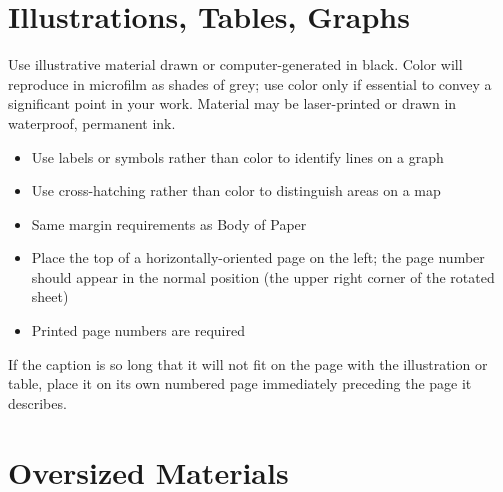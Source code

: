 \documentclass[draft]{ua-thesis}
\begin{document}
\chapter{Illustrations, Tables, Graphs}

Use illustrative material drawn or computer-generated in black. Color will
reproduce in microfilm as shades of grey; use color only if essential to
convey a significant point in your work. Material may be laser-printed or
drawn in waterproof, permanent ink.
\begin{itemize}
   \item Use labels or symbols rather than color to identify lines on a graph
   \item Use cross-hatching rather than color to distinguish areas on a map
   \item Same margin requirements as Body of Paper
   \item Place the top of a horizontally-oriented page on the left; the page
     number should appear in the normal position (the upper right corner of
     the rotated sheet)
   \item Printed page numbers are required
\end{itemize}
If the caption is so long that it will not fit on the page with the
illustration or table, place it on its own numbered page immediately
preceding the page it describes.

\chapter{Oversized Materials}
\end{document}
